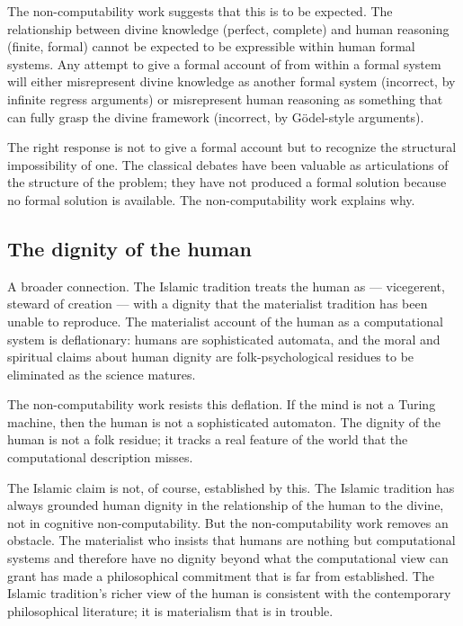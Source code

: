 The non-computability work suggests that this is to be expected.
The relationship between divine knowledge (perfect, complete) and
human reasoning (finite, formal) cannot be expected to be expressible
within human formal systems. Any attempt to give a formal account
of  from within a formal system will either misrepresent
divine knowledge as another formal system (incorrect, by infinite
regress arguments) or misrepresent human reasoning as something
that can fully grasp the divine framework (incorrect, by G\"odel-style
arguments).

The right response is not to give a formal account but to recognize
the structural impossibility of one. The classical 
debates have been valuable as articulations of the structure of
the problem; they have not produced a formal solution because no
formal solution is available. The non-computability work explains
why.

\subsection{The dignity of the human}

A broader connection. The Islamic tradition treats the human as
 --- vicegerent, steward of creation --- with a dignity
that the materialist tradition has been unable to reproduce. The
materialist account of the human as a computational system is
deflationary: humans are sophisticated automata, and the moral and
spiritual claims about human dignity are folk-psychological residues
to be eliminated as the science matures.

The non-computability work resists this deflation. If the mind is
not a Turing machine, then the human is not a sophisticated automaton.
The dignity of the human is not a folk residue; it tracks a real
feature of the world that the computational description misses.

The Islamic claim is not, of course, established by this. The
Islamic tradition has always grounded human dignity in the
relationship of the human to the divine, not in cognitive
non-computability. But the non-computability work removes an
obstacle. The materialist who insists that humans are nothing but
computational systems and therefore have no dignity beyond what
the computational view can grant has made a philosophical
commitment that is far from established. The Islamic tradition's
richer view of the human is consistent with the contemporary
philosophical literature; it is materialism that is in trouble.

